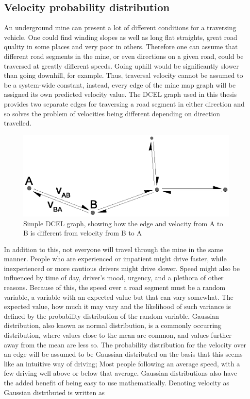 \documentclass{article}
\begin{document}
		\subsection{Velocity probability distribution}
			An underground mine can present a lot of different conditions for a traversing vehicle. One could find winding slopes as well as long flat straights, great road quality in some places and very poor in others. Therefore one can assume that different road segments in the mine, or even directions on a given road, could be traversed at greatly different speeds. Going uphill would be significantly slower than going downhill, for example. Thus, traversal velocity cannot be assumed to be a system-wide constant, instead, every edge of the mine map graph will be assigned its own predicted velocity value. The DCEL graph used in this thesis provides two separate edges for traversing a road segment in either direction and so solves the problem of velocities being different depending on direction travelled.

			\begin{figure}[H]
				\includegraphics[scale=0.7]{simpleDCELVel}
				\caption{Simple DCEL graph, showing how the edge and velocity from A to B is different from velocity from B to A}
				\label{fig:simpleDCELVel}
			\end{figure}

			In addition to this, not everyone will travel through the mine in the same manner. People who are experienced or impatient might drive faster, while inexperienced or more cautious drivers might drive slower. Speed might also be influenced by time of day, driver's mood, urgency, and a plethora of other reasons. Because of this, the speed over a road segment must be a random variable, a variable with an expected value but that can vary somewhat. The expected value, how much it may vary and the likelihood of such variance is defined by the probability distribution of the random variable. Gaussian distribution, also known as normal distribution, is a commonly occurring distribution, where values close to the mean are common, and values further away from the mean are less so. The probability distribution for the velocity over an edge will be assumed to be Gaussian distributed on the basis that this seems like an intuitive way of driving; Most people following an average speed, with a few driving well above or below that average. Gaussian distributions also have the added benefit of being easy to use mathematically. Denoting velocity as Gaussian distributed is written as
\end{document}

